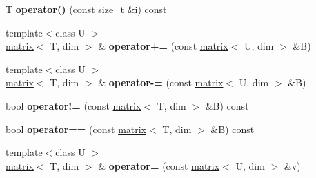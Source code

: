 \begin{DoxyCompactItemize}
\item 
\hypertarget{classkeycpp_1_1matrix_3_01_t_00_01dim_00_01_d_e_n_s_e___m_a_t_r_i_x_01_4_a4adb6446a1710207ed95e217ae76189b}{T {\bfseries operator()} (const size\-\_\-t \&i) const }\label{classkeycpp_1_1matrix_3_01_t_00_01dim_00_01_d_e_n_s_e___m_a_t_r_i_x_01_4_a4adb6446a1710207ed95e217ae76189b}

\item 
\hypertarget{classkeycpp_1_1matrix_3_01_t_00_01dim_00_01_d_e_n_s_e___m_a_t_r_i_x_01_4_a0a371aa1e667199f36a4afc8abbded8d}{{\footnotesize template$<$class U $>$ }\\\hyperlink{classkeycpp_1_1matrix}{matrix}$<$ T, dim $>$ \& {\bfseries operator+=} (const \hyperlink{classkeycpp_1_1matrix}{matrix}$<$ U, dim $>$ \&B)}\label{classkeycpp_1_1matrix_3_01_t_00_01dim_00_01_d_e_n_s_e___m_a_t_r_i_x_01_4_a0a371aa1e667199f36a4afc8abbded8d}

\item 
\hypertarget{classkeycpp_1_1matrix_3_01_t_00_01dim_00_01_d_e_n_s_e___m_a_t_r_i_x_01_4_a53cd54f01dd7fd5eac7cf1ab05b52136}{{\footnotesize template$<$class U $>$ }\\\hyperlink{classkeycpp_1_1matrix}{matrix}$<$ T, dim $>$ \& {\bfseries operator-\/=} (const \hyperlink{classkeycpp_1_1matrix}{matrix}$<$ U, dim $>$ \&B)}\label{classkeycpp_1_1matrix_3_01_t_00_01dim_00_01_d_e_n_s_e___m_a_t_r_i_x_01_4_a53cd54f01dd7fd5eac7cf1ab05b52136}

\item 
\hypertarget{classkeycpp_1_1matrix_3_01_t_00_01dim_00_01_d_e_n_s_e___m_a_t_r_i_x_01_4_a63413f901d173feb49a19c45b3ba22ba}{bool {\bfseries operator!=} (const \hyperlink{classkeycpp_1_1matrix}{matrix}$<$ T, dim $>$ \&B) const }\label{classkeycpp_1_1matrix_3_01_t_00_01dim_00_01_d_e_n_s_e___m_a_t_r_i_x_01_4_a63413f901d173feb49a19c45b3ba22ba}

\item 
\hypertarget{classkeycpp_1_1matrix_3_01_t_00_01dim_00_01_d_e_n_s_e___m_a_t_r_i_x_01_4_aa49ab91103b7564b17c24cf110fe6afe}{bool {\bfseries operator==} (const \hyperlink{classkeycpp_1_1matrix}{matrix}$<$ T, dim $>$ \&B) const }\label{classkeycpp_1_1matrix_3_01_t_00_01dim_00_01_d_e_n_s_e___m_a_t_r_i_x_01_4_aa49ab91103b7564b17c24cf110fe6afe}

\item 
\hypertarget{classkeycpp_1_1matrix_3_01_t_00_01dim_00_01_d_e_n_s_e___m_a_t_r_i_x_01_4_a6457b3ca9e3d89b66311ee02049ee085}{{\footnotesize template$<$class U $>$ }\\\hyperlink{classkeycpp_1_1matrix}{matrix}$<$ T, dim $>$ \& {\bfseries operator=} (const \hyperlink{classkeycpp_1_1matrix}{matrix}$<$ U, dim $>$ \&v)}\label{classkeycpp_1_1matrix_3_01_t_00_01dim_00_01_d_e_n_s_e___m_a_t_r_i_x_01_4_a6457b3ca9e3d89b66311ee02049ee085}


\end{DoxyCompactItemize}
